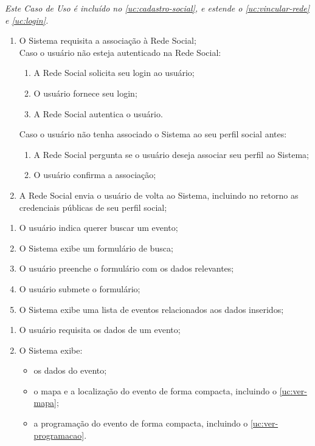 \documentclass[12pt,a4paper,twoside,hyphens,english,brazil]{abntex2}
\begin{document}
{
\emph{Este Caso de Uso é incluído no \ref{uc:cadastro-social}, e estende o \ref{uc:vincular-rede} e \ref{uc:login}.}
\begin{enumerate}[itemsep=-1ex,topsep=-1ex]
	\item O Sistema requisita a associação à Rede Social;
		\\Caso o usuário não esteja autenticado na Rede Social:
			\begin{enumerate}[itemsep=-1ex,topsep=-1ex]
				\item A Rede Social solicita seu login ao usuário;
				\item O usuário fornece seu login;
				\item A Rede Social autentica o usuário.
			\end{enumerate}
		Caso o usuário não tenha associado o Sistema ao seu perfil social antes:
			\begin{enumerate}[itemsep=-1ex,topsep=-1ex]
				\item A Rede Social pergunta se o usuário deseja associar seu perfil ao Sistema;
				\item O usuário confirma a associação;
			\end{enumerate}
	\item A Rede Social envia o usuário de volta ao Sistema, incluindo no retorno as credenciais públicas de seu perfil social;
\end{enumerate}

\begin{enumerate}[itemsep=-1ex]
	\item O usuário indica querer buscar um evento;
	\item O Sistema exibe um formulário de busca;
	\item O usuário preenche o formulário com os dados relevantes;
	\item O usuário submete o formulário;
	\item O Sistema exibe uma lista de eventos relacionados aos dados inseridos;
\end{enumerate}

\begin{enumerate}[itemsep=-1ex]
	\item O usuário requisita os dados de um evento;
	\item O Sistema exibe:
		\begin{itemize}[itemsep=-1ex,topsep=-1ex]
			\item os dados do evento;
			\item o mapa e a localização do evento de forma compacta, incluindo o \ref{uc:ver-mapa};
			\item a programação do evento de forma compacta, incluindo o \ref{uc:ver-programacao}.
		\end{itemize}
\end{enumerate}

}
\end{document}
